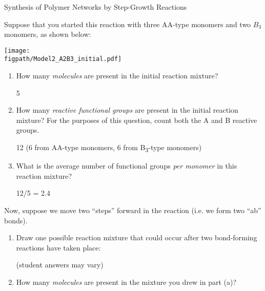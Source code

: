 \begin{activity}[extension]{Synthesis of Polymer Networks by Step-Growth Reactions}
\begin{model}
\end{model}

\begin{ctqs}

	\question Suppose that you started this reaction with three AA-type monomers and two $B_3$ monomers, as shown below:
	
	\vspace{9pt}
		\centerline{\texttt{[image: \\figpath/Model2\_A2B3\_initial.pdf]}}
	
		\begin{enumerate}
			\item How many \emph{molecules} are present in the initial reaction mixture?
			
				\begin{solution}[0.5in]
					5
				\end{solution}
			
			\item How many \emph{reactive functional groups} are present in the initial reaction mixture?  For the purposes of this question, count both the A and B reactive groups.
			
				\begin{solution}[0.5in]
					12 (6 from AA-type monomers, 6 from B\textsubscript{3}-type monomers)
				\end{solution}
				
			\item What is the average number of functional groups \emph{per monomer} in this reaction mixture?
			
				\begin{solution}[0.5in]
					12/5 = 2.4
				\end{solution}
			
		\end{enumerate}
	
	\clearpage
	\question Now, suppose we move two ``steps'' forward in the reaction (i.e. we form two ``ab'' bonds).
	
		\begin{enumerate}
		
			\item Draw one possible reaction mixture that could occur after two bond-forming reactions have taken place:
			
				\begin{solution}[1.5in]
				
					(student answers may vary)
					
				\end{solution}
			\item How many \emph{molecules} are present in the mixture you drew in part (a)?
			

\end{enumerate}
\end{ctqs}
\end{activity}
